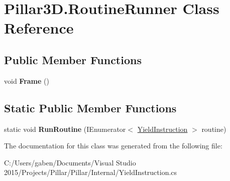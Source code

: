 \hypertarget{class_pillar3_d_1_1_routine_runner}{}\section{Pillar3\+D.\+Routine\+Runner Class Reference}
\label{class_pillar3_d_1_1_routine_runner}
\subsection*{Public Member Functions}
\begin{DoxyCompactItemize}
\item 
\mbox{\label{class_pillar3_d_1_1_routine_runner_ab3443046a8444994ab5ac1de1411c9a8}} 
void {\bfseries Frame} ()
\end{DoxyCompactItemize}
\subsection*{Static Public Member Functions}
\begin{DoxyCompactItemize}
\item 
\mbox{\label{class_pillar3_d_1_1_routine_runner_a99b2e40303c3b01d61f4c189ccbdd173}} 
static void {\bfseries Run\+Routine} (I\+Enumerator$<$ \hyperlink{class_pillar3_d_1_1_yield_instruction}{Yield\+Instruction} $>$ routine)
\end{DoxyCompactItemize}


The documentation for this class was generated from the following file\+:\begin{DoxyCompactItemize}
\item 
C\+:/\+Users/gaben/\+Documents/\+Visual Studio 2015/\+Projects/\+Pillar/\+Pillar/\+Internal/Yield\+Instruction.\+cs\end{DoxyCompactItemize}
